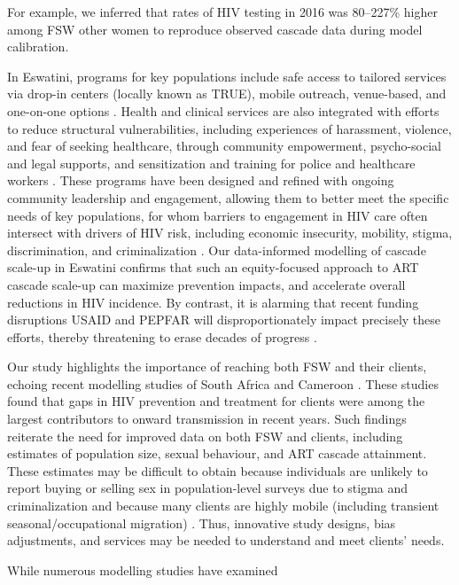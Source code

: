 For example, we inferred that rates of HIV testing in 2016 was 80--227\% higher
among FSW \vs other women to reproduce observed cascade data during model calibration.
\par
In Eswatini, programs for key populations include safe access to tailored services via
drop-in centers (locally known as TRUE), mobile outreach, venue-based,
and one-on-one options \cite{EswIBBS2022}.
Health and clinical services are also integrated with
efforts to reduce structural vulnerabilities, including
experiences of harassment, violence, and fear of seeking healthcare,
through community empowerment, psycho-social and legal supports, and
sensitization and training for police and healthcare workers \cite{EswIBBS2022}.
These programs have been designed and refined with ongoing community leadership and engagement,
allowing them to better meet the specific needs of key populations,
for whom barriers to engagement in HIV care often intersect with drivers of HIV risk,
including economic insecurity, mobility, stigma, discrimination, and criminalization
\cite{Lancaster2016sr,Wanyenze2016,Schwartz2017,Schmidt-Sane2022,Camlin2019,Baral2019}.
Our data-informed modelling of cascade scale-up in Eswatini confirms that
such an equity-focused approach to ART cascade scale-up
can maximize prevention impacts, and accelerate overall reductions in HIV incidence.
By contrast, it is alarming that recent funding disruptions USAID and PEPFAR
will disproportionately impact precisely these efforts,
thereby threatening to erase decades of progress \cite{KPstate2024,Lankiewicz2025}.
\par
Our study highlights the importance of reaching both FSW and their clients,
echoing recent modelling studies of South Africa and Cameroon \cite{Stone2021,Silhol2024ptr}.
These studies found that gaps in HIV prevention and treatment for clients
were among the largest contributors to onward transmission in recent years.
Such findings reiterate the need for improved data on both FSW and clients,
including estimates of population size, sexual behaviour, and ART cascade attainment.
These estimates may be difficult to obtain
because individuals are unlikely to report buying or selling sex in population-level surveys
due to stigma and criminalization \cite{Behanzin2013} and
because many clients are highly mobile
(including transient seasonal/occupational migration) \cite{Camlin2019}.
Thus, innovative study designs, bias adjustments, and services may be needed
to understand and meet clients' needs.
\par
While numerous modelling studies have examined
